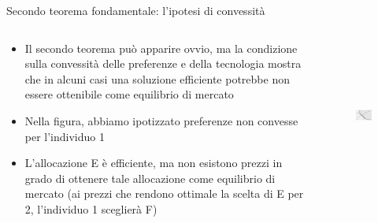 \documentclass[aspectratio=64,11pt]{beamer}
\begin{document}
\begin{frame}{Secondo teorema fondamentale: l'ipotesi di convessità}
\begin{columns}
\begin{column}{.45\columnwidth}
\small
\begin{itemize}
\item Il secondo teorema può apparire ovvio, ma la condizione sulla convessità delle preferenze e della tecnologia mostra che in alcuni casi una soluzione efficiente potrebbe non essere ottenibile come equilibrio di mercato
\item Nella figura, abbiamo ipotizzato preferenze non convesse per l’individuo 1
\item L’allocazione E è efficiente, ma non esistono prezzi in grado di ottenere tale allocazione come equilibrio di mercato (ai prezzi che rendono ottimale la scelta di E per 2, l’individuo 1 sceglierà F)
\end{itemize}
\end{column}

\begin{column}{.55\columnwidth}
\begin{figure}
\centering
\includegraphics[height=5cm]{./figure/edgeworth-7.pdf}
\end{figure}
\end{column}
\end{columns}
\end{frame}
\end{document}
